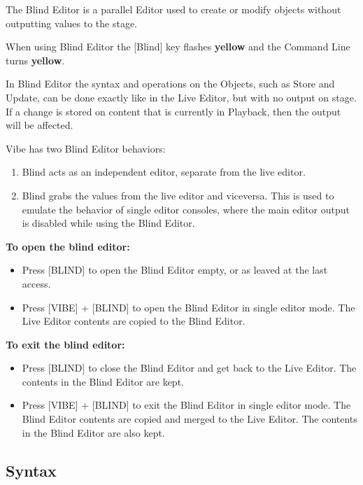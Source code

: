 \documentclass[
]{article}
\begin{document}
The Blind Editor is a parallel Editor used to create or modify objects without outputting values to the stage.

When using Blind Editor the {[}Blind{]} key flashes \textbf{{yellow}} and the Command Line turns \textbf{yellow}.

In Blind Editor the syntax and operations on the Objects, such as Store and Update, can be done exactly like in the Live Editor, but with no output on stage.
If a change is stored on content that is currently in Playback, then the output will be affected.

Vibe has two Blind Editor behaviors:

\begin{enumerate}
\def\labelenumi{\arabic{enumi}.}
\item
  Blind acts as an independent editor, separate from the live editor.
\item
  Blind grabs the values from the live editor and viceversa. This is used to emulate the behavior of single editor consoles, where the main editor output is disabled while using the Blind Editor.
\end{enumerate}

\textbf{To open the blind editor:}

\begin{itemize}
\item
  Press {[}BLIND{]} to open the Blind Editor empty, or as leaved at the last access.
\item
  Press {[}VIBE{]} + {[}BLIND{]} to open the Blind Editor in single editor mode. The Live Editor contents are copied to the Blind Editor.
\end{itemize}

\textbf{To exit the blind editor:}

\begin{itemize}
\item
  Press {[}BLIND{]} to close the Blind Editor and get back to the Live Editor. The contents in the Blind Editor are kept.
\item
  Press {[}VIBE{]} + {[}BLIND{]} to exit the Blind Editor in single editor mode. The Blind Editor contents are copied and merged to the Live Editor. The contents in the Blind Editor are also kept.
\end{itemize}

\hypertarget{Syntax-6.2}{%
\subsection{Syntax}\label{Syntax-6.2}}
\end{document}
